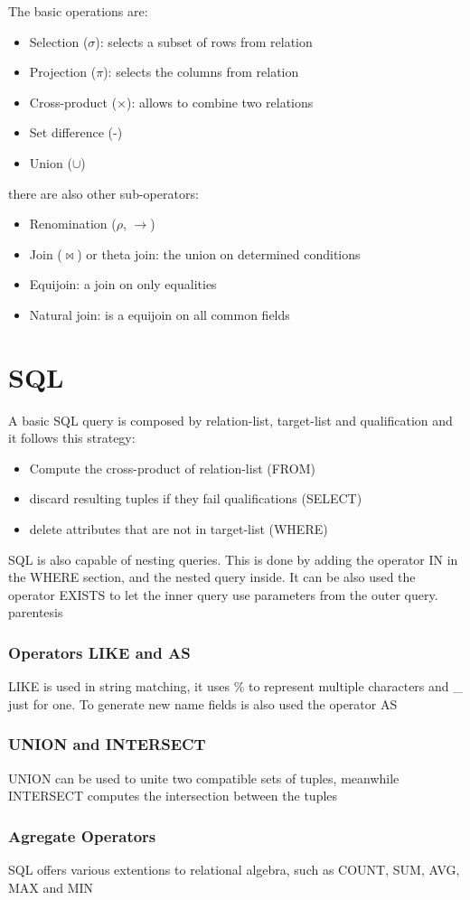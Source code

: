 \documentclass[12pt, a4paper]{article}
\begin{document}
The basic operations are:
\begin{itemize}
    \item Selection ($\sigma$): selects a subset of rows from relation 
    \item Projection ($\pi$): selects the columns from relation
    \item Cross-product ($\times$): allows to combine two relations
    \item Set difference (-) 
    \item Union ($\cup$)
\end{itemize}
there are also other sub-operators:
\begin{itemize}
    \item Renomination ($\rho$, $\rightarrow$)
    \item Join ($\Join$) or theta join: the union on determined conditions
    \item Equijoin: a join on only equalities
    \item Natural join: is a equijoin on all common fields
\end{itemize}

\newpage
\section{SQL}
A basic SQL query is composed by relation-list, target-list and qualification and it follows this strategy:
\begin{itemize}
    \item Compute the cross-product of relation-list (FROM)
    \item discard resulting tuples if they fail qualifications (SELECT)
    \item delete attributes that are not in target-list (WHERE)
\end{itemize}
SQL is also capable of nesting queries. This is done by adding the operator IN in the WHERE section, and the nested query inside.
It can be also used the operator EXISTS to let the inner query use parameters from the outer query.
parentesis

\subsubsection{Operators LIKE and AS}
LIKE is used in string matching, it uses \% to represent multiple characters and \_ just for one. To generate new name fields
is also used the operator AS

\subsubsection{UNION and INTERSECT} 
UNION can be used to unite two compatible sets of tuples, meanwhile INTERSECT computes the intersection between the tuples

\subsubsection{Agregate Operators}
SQL offers various extentions to relational algebra, such as COUNT, SUM, AVG, MAX and MIN
\end{document}
